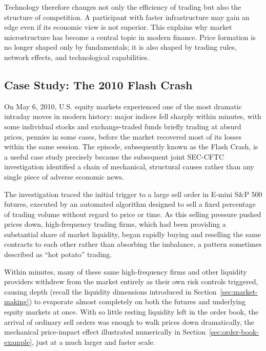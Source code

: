 \documentclass[../ai_in_finance]{subfiles}
\begin{document}
Technology therefore changes not only the efficiency of trading but also the structure of competition. A participant with faster infrastructure may gain an edge even if its economic view is not superior. This explains why market microstructure has become a central topic in modern finance. Price formation is no longer shaped only by fundamentals; it is also shaped by trading rules, network effects, and technological capabilities.

\subsection{Case Study: The 2010 Flash Crash}

On May 6, 2010, U.S. equity markets experienced one of the most dramatic intraday moves in modern history: major indices fell sharply within minutes, with some individual stocks and exchange-traded funds briefly trading at absurd prices, pennies in some cases, before the market recovered most of its losses within the same session. The episode, subsequently known as the Flash Crash, is a useful case study precisely because the subsequent joint SEC-CFTC investigation identified a chain of mechanical, structural causes rather than any single piece of adverse economic news.

The investigation traced the initial trigger to a large sell order in E-mini S\&P 500 futures, executed by an automated algorithm designed to sell a fixed percentage of trading volume without regard to price or time. As this selling pressure pushed prices down, high-frequency trading firms, which had been providing a substantial share of market liquidity, began rapidly buying and reselling the same contracts to each other rather than absorbing the imbalance, a pattern sometimes described as ``hot potato'' trading.

Within minutes, many of these same high-frequency firms and other liquidity providers withdrew from the market entirely as their own risk controls triggered, causing depth (recall the liquidity dimensions introduced in Section~\ref{sec:market-making}) to evaporate almost completely on both the futures and underlying equity markets at once. With so little resting liquidity left in the order book, the arrival of ordinary sell orders was enough to walk prices down dramatically, the mechanical price-impact effect illustrated numerically in Section~\ref{sec:order-book-example}, just at a much larger and faster scale.
\end{document}
